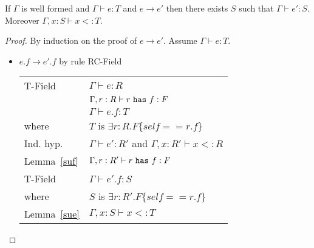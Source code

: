 \documentclass[preprint,nocopyrightspace,9pt]{sigplanconf}
\begin{document}
\begin{thm}\label{sr}
If $\Gamma$ is well formed and $\Gamma\vdash e:T$ and $e\rightarrow e'$ then there exists $S$ such that $\Gamma\vdash e':S$. Moreover $\Gamma,x:S\vdash x<:T$.
\end{thm}

\begin{proof}
By induction on the proof of $e\rightarrow e'$. Assume $\Gamma\vdash e:T$.

\begin{itemize}


\item $e.f \rightarrow e'.f$ by rule {\sc RC-Field}
\\
\begin{tabular}{ll}
{\sc T-Field} & $\Gamma\vdash e:R$
\\
& $\Gamma,r:R\vdash r~{\tt has}~f:F$
\\
& $\Gamma\vdash e.f:T$
\\
where & $T$ is $\exists r:R.F\{self==r.f\}$
\\
Ind. hyp. & $\Gamma\vdash e':R'$ and $\Gamma,x:R'\vdash x<:R$
\\
Lemma~\ref{suf} & $\Gamma,r:R'\vdash r~{\tt has}~f:F$
\\
{\sc T-Field} & $\Gamma\vdash e'.f:S$
\\
where & $S$ is $\exists r:R'.F\{self==r.f\}$
\\
Lemma~\ref{sue} & $\Gamma,x:S\vdash x<:T$
\end{tabular}



\end{itemize}
\end{proof}
\end{document}
